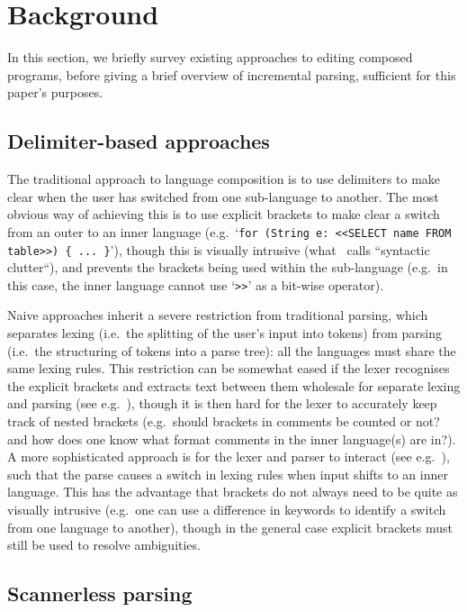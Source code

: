 \documentclass[sigplan,screen]{acmart}\settopmatter{printfolios=true,printccs=false,printacmref=false}
\begin{document}
\section{Background}
\label{sec_background}

In this section, we briefly survey existing approaches to editing composed
programs, before giving a brief overview of incremental parsing, sufficient for
this paper's purposes.


\subsection{Delimiter-based approaches}

The traditional approach to language composition is to use delimiters
to make clear when the user has switched from one sub-language to another. The
most obvious way of achieving this is to use explicit brackets to make clear a
switch from an outer to an inner language (e.g.~`\texttt{for (String e: <<SELECT name
FROM table>>) \{ ... \}}'), though this is visually intrusive
(what~\cite[p.~4]{bravenboer05generalized} calls ``syntactic clutter``), and
prevents the
brackets being used within the sub-language (e.g.~in this case, the inner language
cannot use `\texttt{>>}' as a bit-wise operator).

Naive approaches inherit a severe restriction from traditional parsing, which
separates lexing (i.e.~the splitting of the user's input into tokens) from
parsing (i.e.~the structuring of tokens into a parse tree): all the languages
must share the same lexing rules. This restriction can be somewhat eased if the
lexer recognises the explicit brackets and extracts text between them wholesale
for separate lexing and parsing (see e.g.~\cite[p.~13-14]{tratt08domainspecific}),
though it is then hard for the lexer to accurately keep track of nested
brackets (e.g.~should brackets in comments be counted or not? and how does
one know what format comments in the inner language(s) are in?).  A
more sophisticated approach is for the lexer and parser to interact (see
e.g.~\cite{wyk07context}), such that the parse causes a switch in lexing rules
when input shifts to an inner language.
This has the advantage that brackets do not always need to be quite as visually
intrusive (e.g.~one can use a difference in keywords to identify a switch from
one language to another), though in the general case explicit brackets must still be
used to resolve ambiguities.


\subsection{Scannerless parsing}
\label{sec:scannerless}
\end{document}
